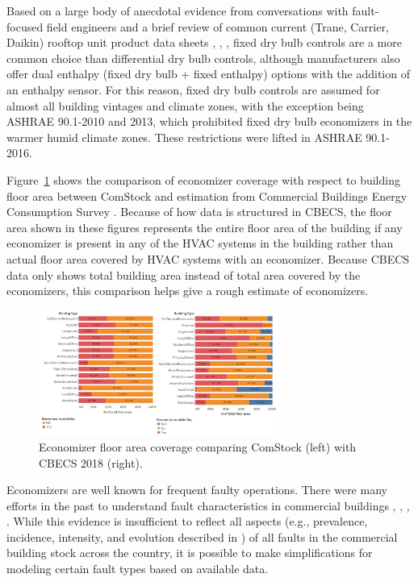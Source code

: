 Based on a large body of anecdotal evidence from conversations with fault-focused field engineers and a brief review of common current (Trane, Carrier, Daikin) rooftop unit product data sheets \citep{trane_foundation}, \citep{carrier_economiser}, \citep{daikin_rebel}, fixed dry bulb controls are a more common choice than differential dry bulb controls, although manufacturers also offer dual enthalpy (fixed dry bulb + fixed enthalpy) options with the addition of an enthalpy sensor. For this reason, fixed dry bulb controls are assumed for almost all building vintages and climate zones, with the exception being ASHRAE 90.1-2010 and 2013, which prohibited fixed dry bulb economizers in the warmer humid climate zones. These restrictions were lifted in ASHRAE 90.1-2016.

Figure~\ref{fig:economizer_prevalence} shows the comparison of economizer coverage with respect to building floor area between ComStock and estimation from Commercial Buildings Energy Consumption Survey \citep{eia2018cbecs}. Because of how data is structured in CBECS, the floor area shown in these figures represents the entire floor area of the building if any economizer is present in any of the HVAC systems in the building rather than actual floor area covered by HVAC systems with an economizer. Because CBECS data only shows total building area instead of total area covered by the economizers, this comparison helps give a rough estimate of economizers.

\begin{figure}
  \centering \includegraphics[width=0.7\textwidth]{figures/economizer_prevalence.png}
  \caption{Economizer floor area coverage comparing ComStock (left) with CBECS 2018 (right).}
  \label{fig:economizer_prevalence}
\end{figure}

Economizers are well known for frequent faulty operations. There were many efforts in the past to understand fault characteristics in commercial buildings \citep{doi_10_1080_23744731_2021_1898243}, \citep{osti_1889192}, \citep{osti_1829706}, \citep{osti_1457127}. While this evidence is insufficient to reflect all aspects (e.g., prevalence, incidence, intensity, and evolution described in \citep{doi_10_1080_23744731_2021_1898243}) of all faults in the commercial building stock across the country, it is possible to make simplifications for modeling certain fault types based on available data.

